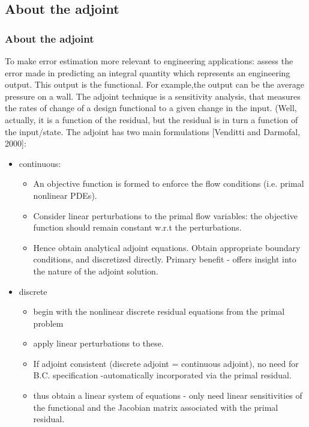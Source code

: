 \documentclass{beamer}
\begin{document}
\subsection[Adjoint]{About the adjoint}
\begin{frame}%
\scriptsize
\frametitle{About the adjoint}
To make error estimation more relevant to engineering applications: assess the error made in predicting an integral quantity which represents an engineering output. This output is the functional. For example,the output can be the average pressure on a wall. The adjoint technique is a sensitivity analysis, that measures the rates of change of a design functional to a given change in the input. (Well, actually, it is a function of the residual, but the residual is in turn a function of the input/state. \newline
The adjoint has two main formulations [Venditti and Darmofal, 2000]:
\begin{itemize}
\item continuous:
\begin{itemize} 
\tiny
\item An objective function is formed to enforce the flow conditions (i.e. primal nonlinear PDEs). 
\item Consider linear perturbations to the primal flow variables: the objective function should remain constant w.r.t the perturbations.
\item Hence obtain analytical adjoint equations. Obtain appropriate boundary conditions, and discretized directly. Primary benefit - offers insight into the nature of the adjoint solution.
\end{itemize}
\item discrete 
\begin{itemize}
\tiny
\item begin with the nonlinear discrete residual equations from the primal problem
\item apply linear perturbations to these. 
\item If adjoint consistent (discrete adjoint = continuous adjoint), no need for B.C. specification -automatically incorporated via the primal residual.   
\item thus obtain a linear system of equations - only need linear sensitivities of the functional and the Jacobian matrix associated with the primal residual.
\end{itemize}
\end{itemize}
\end{frame}
\end{document}
